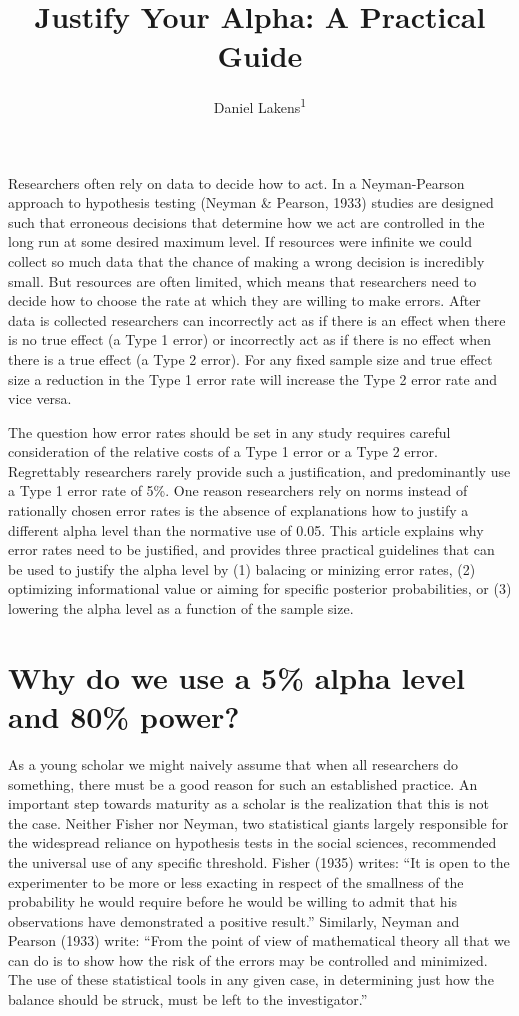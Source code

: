 \documentclass[
  english,
  ,jou,floatsintext]{apa6}
\author{Daniel Lakens\textsuperscript{1}}
\affiliation{
\vspace{0.5cm}
\textsuperscript{1} Eindhoven University of Technology, The Netherlands}
\title{Justify Your Alpha: A Practical Guide}
\date{}
\begin{document}
\maketitle

Researchers often rely on data to decide how to act. In a Neyman-Pearson approach to hypothesis testing (Neyman \& Pearson, 1933) studies are designed such that erroneous decisions that determine how we act are controlled in the long run at some desired maximum level. If resources were infinite we could collect so much data that the chance of making a wrong decision is incredibly small. But resources are often limited, which means that researchers need to decide how to choose the rate at which they are willing to make errors. After data is collected researchers can incorrectly act as if there is an effect when there is no true effect (a Type 1 error) or incorrectly act as if there is no effect when there is a true effect (a Type 2 error). For any fixed sample size and true effect size a reduction in the Type 1 error rate will increase the Type 2 error rate and vice versa.

The question how error rates should be set in any study requires careful consideration of the relative costs of a Type 1 error or a Type 2 error. Regrettably researchers rarely provide such a justification, and predominantly use a Type 1 error rate of 5\%. One reason researchers rely on norms instead of rationally chosen error rates is the absence of explanations how to justify a different alpha level than the normative use of 0.05. This article explains why error rates need to be justified, and provides three practical guidelines that can be used to justify the alpha level by (1) balacing or minizing error rates, (2) optimizing informational value or aiming for specific posterior probabilities, or (3) lowering the alpha level as a function of the sample size.

\hypertarget{why-do-we-use-a-5-alpha-level-and-80-power}{%
\section{Why do we use a 5\% alpha level and 80\% power?}\label{why-do-we-use-a-5-alpha-level-and-80-power}}

As a young scholar we might naively assume that when all researchers do something, there must be a good reason for such an established practice. An important step towards maturity as a scholar is the realization that this is not the case. Neither Fisher nor Neyman, two statistical giants largely responsible for the widespread reliance on hypothesis tests in the social sciences, recommended the universal use of any specific threshold. Fisher (1935) writes: ``It is open to the experimenter to be more or less exacting in respect of the smallness of the probability he would require before he would be willing to admit that his observations have demonstrated a positive result.'' Similarly, Neyman and Pearson (1933) write: ``From the point of view of mathematical theory all that we can do is to show how the risk of the errors may be controlled and minimized. The use of these statistical tools in any given case, in determining just how the balance should be struck, must be left to the investigator.''
\end{document}
